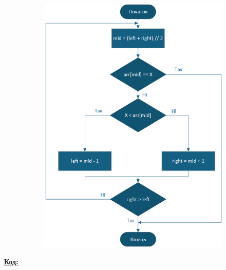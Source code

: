 \documentclass[12pt,a4paper]{article}
\begin{document}
\begin{figure}[H]
\begin{subfigure}{0.23\textwidth}
            \label{fig:a}
        \end{subfigure}
        \begin{subfigure}{0.76\textwidth}
            \includegraphics[width=\linewidth]{bin_sort.png}
            \label{fig:b}
        \end{subfigure}
    \end{figure}

    \newpage

    \textbf{\underline{Код:}}

    \vspace{1em}
\end{document}
